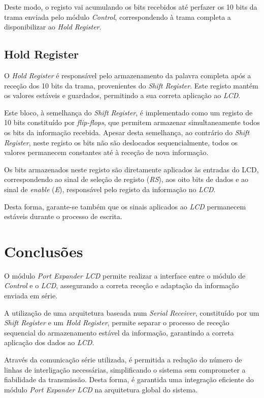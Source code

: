 \documentclass[10pt,a4paper,twocolumn]{article}
\begin{document}
\noindent \par Deste modo, o registo vai acumulando os bits recebidos até perfazer os 10 bits da trama enviada pelo módulo \textit{Control}, correspondendo à trama completa a disponibilizar ao \textit{Hold Register}.

\subsection{Hold Register}

\noindent \par O \textit{Hold Register} é responsável pelo armazenamento da palavra completa após a receção dos 10 bits da trama, provenientes do \textit{Shift Register}. Este registo mantém os valores estáveis e guardados, permitindo a sua correta aplicação ao \textit{LCD}.

\noindent \par Este bloco, à semelhança do \textit{Shift Register}, é implementado como um registo de 10 bits constituído por \textit{flip-flops}, que permitem armazenar simultaneamente todos os bits da informação recebida. Apesar desta semelhança, ao contrário do \textit{Shift Register}, neste registo os bits não são deslocados sequencialmente, todos os valores permanecem constantes até à receção de nova informação.

\noindent \par Os bits armazenados neste registo são diretamente aplicados às entradas do LCD, correspondendo ao sinal de seleção de registo (\textit{RS}), aos oito bits de dados e ao sinal de \textit{enable} (\textit{E}), responsável pelo registo da informação no \textit{LCD}.
\noindent \par Desta forma, garante-se também que os sinais aplicados ao \textit{LCD} permanecem estáveis durante o processo de escrita.




\section{Conclusões}

\noindent \par O módulo \textit{Port Expander LCD} permite realizar a interface entre o módulo de \textit{Control} e o \textit{LCD}, assegurando a correta receção e adaptação da informação enviada em série.
\noindent \par A utilização de uma arquitetura baseada num \textit{Serial Receiver}, constituído por um \textit{Shift Register} e um \textit{Hold Register}, permite separar o processo de receção sequencial do armazenamento estável da informação, garantindo a correta aplicação dos dados ao \textit{LCD}.
\noindent \par Através da comunicação série utilizada, é permitida a redução do número de linhas de interligação necessárias, simplificando o sistema sem comprometer a fiabilidade da transmissão. Desta forma, é garantida uma integração eficiente do módulo \textit{Port Expander LCD} na arquitetura global do sistema.
\end{document}
